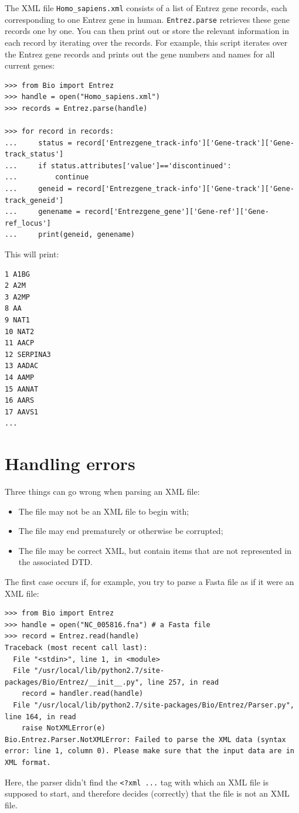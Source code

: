 \documentclass{report}
\begin{document}
The XML file \verb+Homo_sapiens.xml+ consists of a list of Entrez gene records, each corresponding to one Entrez gene in human. \verb+Entrez.parse+ retrieves these gene records one by one. You can then print out or store the relevant information in each record by iterating over the records. For example, this script iterates over the Entrez gene records and prints out the gene numbers and names for all current genes:

\begin{verbatim}
>>> from Bio import Entrez
>>> handle = open("Homo_sapiens.xml")
>>> records = Entrez.parse(handle)

>>> for record in records:
...     status = record['Entrezgene_track-info']['Gene-track']['Gene-track_status']
...     if status.attributes['value']=='discontinued':
...         continue
...     geneid = record['Entrezgene_track-info']['Gene-track']['Gene-track_geneid']
...     genename = record['Entrezgene_gene']['Gene-ref']['Gene-ref_locus']
...     print(geneid, genename)
\end{verbatim}

This will print:
\begin{verbatim}
1 A1BG
2 A2M
3 A2MP
8 AA
9 NAT1
10 NAT2
11 AACP
12 SERPINA3
13 AADAC
14 AAMP
15 AANAT
16 AARS
17 AAVS1
...
\end{verbatim}


\section{Handling errors}

Three things can go wrong when parsing an XML file:
\begin{itemize}
\item The file may not be an XML file to begin with;
\item The file may end prematurely or otherwise be corrupted;
\item The file may be correct XML, but contain items that are not represented in the associated DTD.
\end{itemize}

The first case occurs if, for example, you try to parse a Fasta file as if it were an XML file:
\begin{verbatim}
>>> from Bio import Entrez
>>> handle = open("NC_005816.fna") # a Fasta file
>>> record = Entrez.read(handle)
Traceback (most recent call last):
  File "<stdin>", line 1, in <module>
  File "/usr/local/lib/python2.7/site-packages/Bio/Entrez/__init__.py", line 257, in read
    record = handler.read(handle)
  File "/usr/local/lib/python2.7/site-packages/Bio/Entrez/Parser.py", line 164, in read
    raise NotXMLError(e)
Bio.Entrez.Parser.NotXMLError: Failed to parse the XML data (syntax error: line 1, column 0). Please make sure that the input data are in XML format.
\end{verbatim}
Here, the parser didn't find the \verb|<?xml ...| tag with which an XML file is supposed to start, and therefore decides (correctly) that the file is not an XML file.
\end{document}
